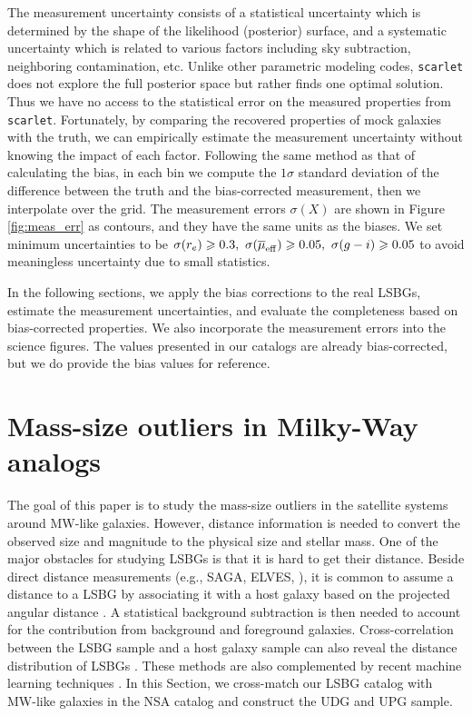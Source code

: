\documentclass[twocolumn,astrosymb,twocolappendix]{aastex631}
\newcommand{\code}[1]{\texttt{#1}}
\begin{document}
\begin{CJK*}{UTF8}{gbsn}
The measurement uncertainty consists of a statistical uncertainty which is determined by the shape of the likelihood (posterior) surface, and a systematic uncertainty which is related to various factors including sky subtraction, neighboring contamination, etc. Unlike other parametric modeling codes, \code{scarlet} does not explore the full posterior space but rather finds one optimal solution. Thus we have no access to the statistical error on the measured properties from \code{scarlet}. Fortunately, by comparing the recovered properties of mock galaxies with the truth, we can empirically estimate the measurement uncertainty without knowing the impact of each factor. Following the same method as that of calculating the bias, in each bin we compute the $1\sigma$ standard deviation of the difference between the truth and the bias-corrected measurement, then we interpolate over the grid. The measurement errors $\sigma(X)$ are shown in Figure \ref{fig:meas_err} as contours, and they have the same units as the biases. We set minimum uncertainties to be $\sigma(r_e) \geqslant 0.3,\ \sigma(\overline{\mu}_{\rm eff}) \geqslant 0.05,\ \sigma(g-i) \geqslant 0.05$ to avoid meaningless uncertainty due to small statistics.

In the following sections, we apply the bias corrections to the real LSBGs, estimate the measurement uncertainties, and evaluate the completeness based on bias-corrected properties. We also incorporate the measurement errors into the science figures. The values presented in our catalogs are already bias-corrected, but we do provide the bias values for reference. 


\section{Mass-size outliers in Milky-Way analogs}\label{sec:sample_construction}
The goal of this paper is to study the mass-size outliers in the satellite systems around MW-like galaxies. However, distance information is needed to convert the observed size and magnitude to the physical size and stellar mass. One of the major obstacles for studying LSBGs is that it is hard to get their distance. Beside direct distance measurements (e.g., SAGA, ELVES, \citealt{Kadowaki2021}), it is common to assume a distance to a LSBG by associating it with a host galaxy based on the projected angular distance \citep[e.g.,][]{vanDokkum2015,vdBurg2016,Wang2021,Zaritsky2022,Nashimoto2022}. A statistical background subtraction is then needed to account for the contribution from background and foreground galaxies. Cross-correlation between the LSBG sample and a host galaxy sample can also reveal the distance distribution of LSBGs \citep{Greene2022}. These methods are also complemented by recent machine learning techniques \citep{Baxter2021,xSAGA-I}. In this Section, we cross-match our LSBG catalog with MW-like galaxies in the NSA catalog and construct the UDG and UPG sample. 


\end{CJK*}
\end{document}
